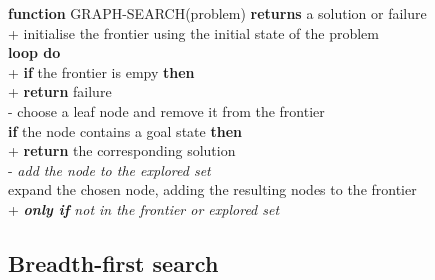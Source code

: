 \documentclass{article}
\begin{document}
\begin{pseudo}
\textbf{function} GRAPH-SEARCH(problem) \textbf{returns} a solution or failure  \\+
    initialise the frontier using the initial state of the problem              \\
    \textbf{loop do}                                                            \\+
        \textbf{if} the frontier is empy \textbf{then}                          \\+
            \textbf{return} failure                                             \\-
        choose a leaf node and remove it from the frontier                      \\
        \textbf{if} the node contains a goal state \textbf{then}                \\+
            \textbf{return} the corresponding solution                          \\-
        \emph{add the node to the explored set}                                 \\
        expand the chosen node, adding the resulting nodes to the frontier      \\+
            \emph{\textbf{only if} not in the frontier or explored set}
\end{pseudo}

\subsection{Breadth-first search}
\end{document}
